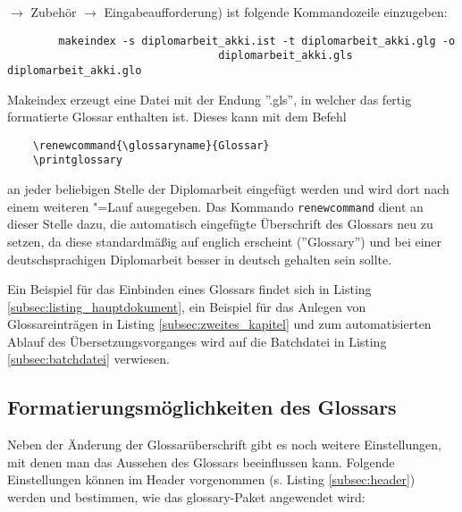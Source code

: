 $\rightarrow$ Zubehör $\rightarrow$ Eingabeaufforderung) ist folgende Kommandozeile einzugeben:
\begin{verbatim}
		makeindex -s diplomarbeit_akki.ist -t diplomarbeit_akki.glg -o
								 diplomarbeit_akki.gls diplomarbeit_akki.glo
\end{verbatim}
Makeindex erzeugt eine Datei mit der Endung ''.gls'', in welcher das fertig formatierte Glossar
enthalten ist. Dieses kann mit dem Befehl
\begin{verbatim}
	\renewcommand{\glossaryname}{Glossar}
	\printglossary
\end{verbatim}
an jeder beliebigen Stelle der Diplomarbeit eingefügt werden und wird dort nach einem weiteren
\DMLLaTeX"=Lauf ausgegeben. Das Kommando \texttt{renewcommand} dient an dieser Stelle dazu, die
automatisch eingefügte Überschrift des Glossars neu zu setzen, da diese standardmäßig auf
englich erscheint (''Glossary'') und bei einer deutschsprachigen Diplomarbeit besser in deutsch
gehalten sein sollte.

Ein Beispiel für das Einbinden eines Glossars findet sich in Listing
\ref{subsec:listing_hauptdokument}, ein Beispiel für das Anlegen von Glossareinträgen in Listing
\ref{subsec:zweites_kapitel} und zum automatisierten Ablauf des Übersetzungsvorganges wird auf
die Batchdatei in Listing \ref{subsec:batchdatei} verwiesen.

\subsection{Formatierungsmöglichkeiten des Glossars}
Neben der Änderung der Glossarüberschrift gibt es noch weitere Einstellungen, mit denen man das
Aussehen des Glossars beeinflussen kann. Folgende Einstellungen können im Header vorgenommen
(s. Listing \ref{subsec:header}) werden und bestimmen, wie das glossary-Paket angewendet wird:

